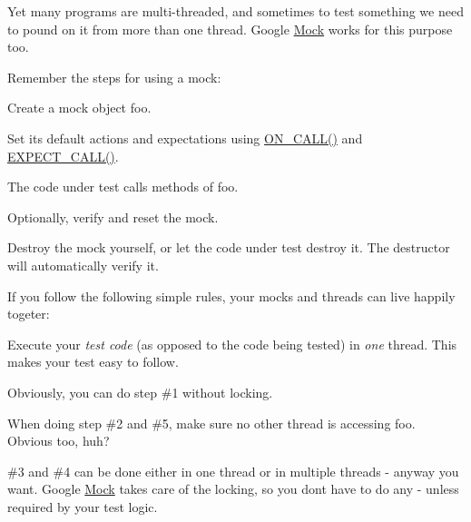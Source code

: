 Yet many programs are multi-\/threaded, and sometimes to test something we need to pound on it from more than one thread. Google \hyperlink{class_mock}{Mock} works for this purpose too.

Remember the steps for using a mock\+:


\begin{DoxyEnumerate}
\item Create a mock object {\ttfamily foo}.
\end{DoxyEnumerate}
\begin{DoxyEnumerate}
\item Set its default actions and expectations using {\ttfamily \hyperlink{gmock-spec-builders_8h_a5b12ae6cf84f0a544ca811b380c37334}{O\+N\+\_\+\+C\+A\+L\+L()}} and {\ttfamily \hyperlink{gmock-spec-builders_8h_a535a6156de72c1a2e25a127e38ee5232}{E\+X\+P\+E\+C\+T\+\_\+\+C\+A\+L\+L()}}.
\end{DoxyEnumerate}
\begin{DoxyEnumerate}
\item The code under test calls methods of {\ttfamily foo}.
\end{DoxyEnumerate}
\begin{DoxyEnumerate}
\item Optionally, verify and reset the mock.
\end{DoxyEnumerate}
\begin{DoxyEnumerate}
\item Destroy the mock yourself, or let the code under test destroy it. The destructor will automatically verify it.
\end{DoxyEnumerate}

If you follow the following simple rules, your mocks and threads can live happily togeter\+:


\begin{DoxyItemize}
\item Execute your {\itshape test code} (as opposed to the code being tested) in {\itshape one} thread. This makes your test easy to follow.
\item Obviously, you can do step \#1 without locking.
\item When doing step \#2 and \#5, make sure no other thread is accessing {\ttfamily foo}. Obvious too, huh?
\item \#3 and \#4 can be done either in one thread or in multiple threads -\/ anyway you want. Google \hyperlink{class_mock}{Mock} takes care of the locking, so you don\textquotesingle{}t have to do any -\/ unless required by your test logic.
\end{DoxyItemize}

